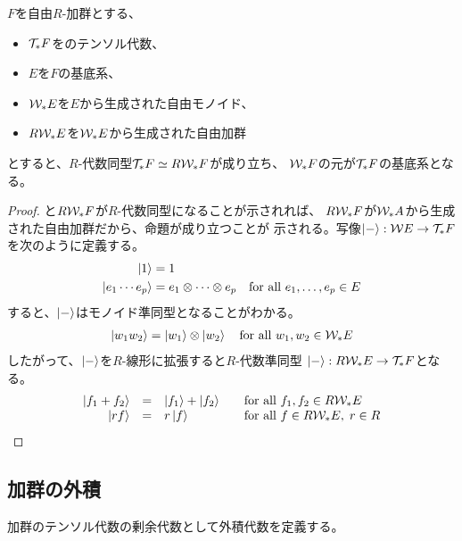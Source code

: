 {	\begin{proposition}[自由加群のテンソル代数]
	\label{prop:自由加群のテンソル代数} %
		$F$を自由$R$-加群とする、
		\begin{itemize}\setlength{\itemsep}{-1mm} %
			\item ${{\mathcal{T}}}_*F$をのテンソル代数、
			\item $E$を$F$の基底系、
			\item ${{\mathcal{W}}}_*E$を$E$から生成された自由モノイド、
			\item $R{{\mathcal{W}}}_*E$を${{\mathcal{W}}}_*E$から生成された自由加群
		\end{itemize} %
		とすると、$R$-代数同型${{\mathcal{T}}}_*F\simeq R{{\mathcal{W}}}_*F$が成り立ち、
		${{\mathcal{W}}}_*F$の元が${{\mathcal{T}}}_*F$の基底系となる。
	\end{proposition} %
	\begin{proof} と$R{{\mathcal{W}}}_*F$が$R$-代数同型になることが示されれば、
		$R{{\mathcal{W}}}_*F$が${{\mathcal{W}}}_*A$から生成された自由加群だから、命題が成り立つことが
		示される。写像$\mathinner{|{-}\rangle}:{{\mathcal{W}}} E\to{\ensuremath{{\mathcal{T}}}}_*F$を次のように定義する。
		\begin{equation*}\begin{split}
			\mathinner{|{1}\rangle} &= 1 \\
			\mathinner{|{e_1\cdots e_p}\rangle} &= e_1\otimes\cdots\otimes e_p
			\quad\text{for all } e_1,\dots,e_p\in E
		\end{split}\end{equation*}
		すると、$\mathinner{|{-}\rangle}$はモノイド準同型となることがわかる。
		\begin{equation*}\begin{split}
			\mathinner{|{w_1w_2}\rangle} = \mathinner{|{w_1}\rangle}\otimes\mathinner{|{w_2}\rangle}
			\quad\text{for all } w_1,w_2\in{\ensuremath{{\mathcal{W}}}}_*E
		\end{split}\end{equation*}
		したがって、$\mathinner{|{-}\rangle}$を$R$-線形に拡張すると$R$-代数準同型
		$\mathinner{|{-}\rangle}:R{{\mathcal{W}}}_*E\to{\ensuremath{{\mathcal{T}}}}_*F$となる。
		\begin{equation*}\begin{array}{rcll}
			\mathinner{|{f_1 + f_2}\rangle} &=& \mathinner{|{f_1}\rangle} + \mathinner{|{f_2}\rangle}
			&\quad\text{for all } f_1,f_2\in R{{\mathcal{W}}}_*E \\
			\mathinner{|{rf}\rangle} &=& r\mathinner{|{f}\rangle} &\quad\text{for all } f\in R{{\mathcal{W}}}_*E,\; r\in R
		\end{array}\end{equation*}
	\end{proof}

\subsection{加群の外積}\label{s2:加群の外積} %
	加群のテンソル代数の剰余代数として外積代数を定義する。

}
